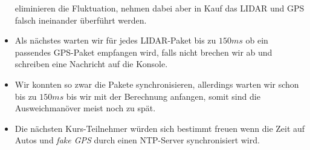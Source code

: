 \documentclass[10pt,oneside,a4paper]{article}
\begin{document}
\begin{itemize}
            eliminieren die Fluktuation, nehmen dabei aber in Kauf das LIDAR und GPS falsch ineinander
            \"uberf\"uhrt werden.
            \item Als n\"achstes warten wir f\"ur jedes LIDAR-Paket bis zu $150ms$ ob ein passendes GPS-Paket
            empfangen wird, falls nicht brechen wir ab und schreiben eine Nachricht auf die Konsole.
            \item Wir konnten so zwar die Pakete synchronisieren, allerdings warten wir schon bis zu $150ms$
            bis wir mit der Berechnung anfangen, somit sind die Ausweichman\"over meist noch zu sp\"at.
            \item Die n\"achsten Kurs-Teilnehmer w\"urden sich bestimmt freuen wenn die Zeit auf Autos und
            \emph{fake GPS} durch einen NTP-Server synchronisiert wird.
        \end{itemize}
\end{document}
